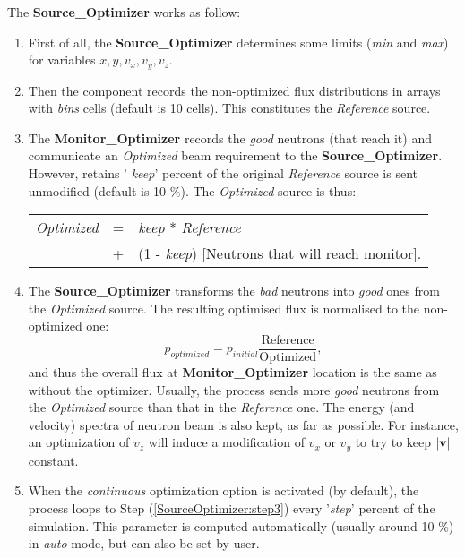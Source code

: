 The {\bf Source\_Optimizer} works as follow:
\begin{enumerate}
\item{First of all, the {\bf Source\_Optimizer} determines some limits
    ({\it min} and {\it max}) for variables $x, y, v_x, v_y, v_z$.}
\item{Then the component records the non-optimized flux distributions in
    arrays with {\it bins} cells (default is 10 cells). This constitutes
    the {\it Reference } source.}
\item{\label {SourceOptimizer:step3}The {\bf Monitor\_Optimizer} records
    the {\it good} neutrons (that reach it) and communicate an {\it
      Optimized} beam requirement to the {\bf Source\_Optimizer}. However, retains '{\it
      keep}' percent of the original {\it Reference} source is sent
    unmodified (default is 10 \%). The {\it Optimized} source is thus:

    \begin{center}
      \begin{tabular}{rcl}
        {\it Optimized} & = & {\it keep} * {\it Reference} \\
        & + & (1 - {\it keep}) [Neutrons that will reach monitor].
      \end{tabular}
    \end{center}
    }
\item{The {\bf Source\_Optimizer} transforms the {\it bad} neutrons into
    {\it good} ones from the {\it Optimized} source. The resulting
    optimised flux is normalised to the non-optimized one:
    \begin{equation}
      p_{optimized} = p_{initial} \frac{\mbox{Reference}}{\mbox{Optimized}},
    \end{equation}
    and thus the overall flux at {\bf Monitor\_Optimizer} location is
    the same as without the optimizer. Usually, the process sends more
    {\it good} neutrons from the {\it Optimized} source than that in the
    {\it Reference} one.
    The energy (and velocity) spectra of neutron beam is also kept, as
    far as possible. For instance, an optimization of $v_z$ will induce
    a modification of $v_x$ or $v_y$ to try to keep $|{\bf v}|$
    constant.
    }
\item{When the {\it continuous} optimization option is activated (by
    default), the process loops to Step (\ref{SourceOptimizer:step3})
    every '{\it step}' percent of the simulation. This parameter is
    computed automatically (usually around 10 \%) in {\it auto} mode,
    but can also be set by user.}
\end{enumerate}

